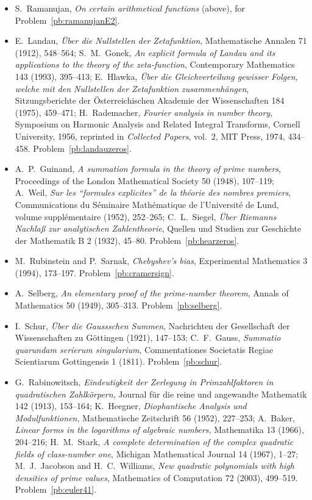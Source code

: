 \begin{itemize}
\item S.~Ramanujan, \emph{On certain arithmetical functions} (above), for Problem~\ref{pb:ramanujanE2}.
\item E.~Landau, \emph{Über die Nullstellen der Zetafunktion}, Mathematische Annalen 71 (1912), 548--564; S.~M.~Gonek, \emph{An explicit formula of Landau and its applications to the theory of the zeta-function}, Contemporary Mathematics 143 (1993), 395--413; E.~Hlawka, \emph{Über die Gleichverteilung gewisser Folgen, welche mit den Nullstellen der Zetafunktion zusammenhängen}, Sitzungsberichte der Österreichischen Akademie der Wissenschaften 184 (1975), 459--471; H.~Rademacher, \emph{Fourier analysis in number theory}, Symposium on Harmonic Analysis and Related Integral Transforms, Cornell University, 1956, reprinted in \emph{Collected Papers}, vol.~2, MIT Press, 1974, 434--458. Problem~\ref{pb:landauzeros}.
\item A.~P.~Guinand, \emph{A summation formula in the theory of prime numbers}, Proceedings of the London Mathematical Society 50 (1948), 107--119; A.~Weil, \emph{Sur les ``formules explicites'' de la théorie des nombres premiers}, Communications du Séminaire Mathématique de l'Université de Lund, volume supplémentaire (1952), 252--265; C.~L.~Siegel, \emph{Über Riemanns Nachlaß zur analytischen Zahlentheorie}, Quellen und Studien zur Geschichte der Mathematik B 2 (1932), 45--80. Problem~\ref{pb:hearzeros}.
\item M.~Rubinstein and P.~Sarnak, \emph{Chebyshev's bias}, Experimental Mathematics 3 (1994), 173--197. Problem~\ref{pb:cramersign}.
\item A.~Selberg, \emph{An elementary proof of the prime-number theorem}, Annals of Mathematics 50 (1949), 305--313. Problem~\ref{pb:selberg}.
\item I.~Schur, \emph{Über die Gaussschen Summen}, Nachrichten der Gesellschaft der Wissenschaften zu Göttingen (1921), 147--153; C.~F.~Gauss, \emph{Summatio quarundam serierum singularium}, Commentationes Societatis Regiae Scientiarum Gottingensis 1 (1811). Problem~\ref{pb:schur}.
\item G.~Rabinowitsch, \emph{Eindeutigkeit der Zerlegung in Primzahlfaktoren in quadratischen Zahlkörpern}, Journal für die reine und angewandte Mathematik 142 (1913), 153--164; K.~Heegner, \emph{Diophantische Analysis und Modulfunktionen}, Mathematische Zeitschrift 56 (1952), 227--253; A.~Baker, \emph{Linear forms in the logarithms of algebraic numbers}, Mathematika 13 (1966), 204--216; H.~M.~Stark, \emph{A complete determination of the complex quadratic fields of class-number one}, Michigan Mathematical Journal 14 (1967), 1--27; M.~J.~Jacobson and H.~C.~Williams, \emph{New quadratic polynomials with high densities of prime values}, Mathematics of Computation 72 (2003), 499--519. Problem~\ref{pb:euler41}.

\end{itemize}

